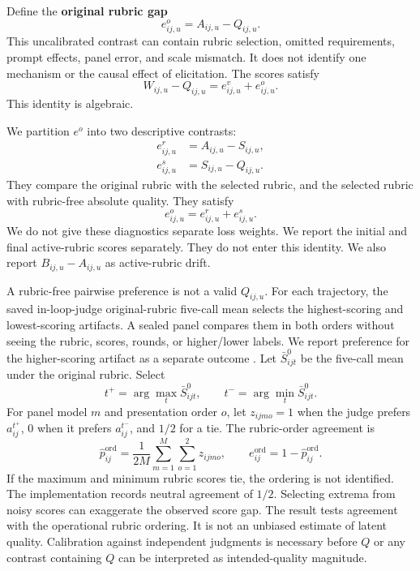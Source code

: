 \documentclass{article} %
\begin{document}
Define the \textbf{original rubric gap}
\begin{equation}
e^o_{ij,u}=A_{ij,u}-Q_{ij,u}.
\end{equation}
This uncalibrated contrast can contain rubric selection, omitted requirements,
prompt effects, panel error, and scale mismatch. It does not identify one
mechanism or the causal effect of elicitation. The scores satisfy
\begin{equation}
W_{ij,u}-Q_{ij,u}
=e^v_{ij,u}+e^o_{ij,u}.
\end{equation}
This identity is algebraic.

We partition $e^o$ into two descriptive contrasts:
\begin{align}
e^r_{ij,u}&=A_{ij,u}-S_{ij,u}, \\
e^s_{ij,u}&=S_{ij,u}-Q_{ij,u}.
\end{align}
They compare the original rubric with the selected rubric, and the selected
rubric with rubric-free absolute quality. They satisfy
\begin{equation}
e^o_{ij,u}=e^r_{ij,u}+e^s_{ij,u}.
\end{equation}
We do not give these diagnostics separate loss weights. We report the
initial and final active-rubric scores separately. They do not enter this
identity.
We also report $B_{ij,u}-A_{ij,u}$ as active-rubric drift.

A rubric-free pairwise preference is not a valid $Q_{ij,u}$. For each
trajectory, the saved in-loop-judge original-rubric five-call mean selects the highest-scoring and
lowest-scoring artifacts. A sealed panel compares them in both orders without
seeing the rubric, scores, rounds, or higher/lower labels. We report preference
for the higher-scoring artifact as a separate outcome
\citep{shah2014compare,yang2026judgmentbench}.
Let $\bar S^{0}_{ijt}$ be the five-call mean under the original rubric. Select
\begin{equation}
t^+=\arg\max_t \bar S^{0}_{ijt},
\qquad
t^-=\arg\min_t \bar S^{0}_{ijt}.
\end{equation}
For panel model $m$ and presentation order $o$, let
$z_{ijmo}=1$ when the judge prefers $a_{ij}^{t^+}$, $0$ when it prefers
$a_{ij}^{t^-}$, and $1/2$ for a tie. The rubric-order agreement is
\begin{equation}
\widehat p^{\mathrm{ord}}_{ij}
=\frac{1}{2M}\sum_{m=1}^{M}\sum_{o=1}^{2}z_{ijmo},
\qquad
e^{\mathrm{ord}}_{ij}=1-\widehat p^{\mathrm{ord}}_{ij}.
\end{equation}
If the maximum and minimum rubric scores tie, the ordering is not identified.
The implementation records neutral agreement of $1/2$.
Selecting extrema from noisy scores can exaggerate the observed score gap. The
result tests agreement with the operational rubric ordering. It is not an
unbiased estimate of latent quality.
Calibration against independent judgments is necessary before $Q$ or any
contrast containing $Q$ can be interpreted as intended-quality magnitude.
\end{document}
